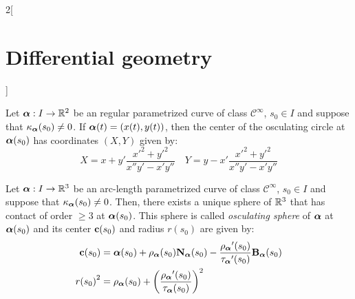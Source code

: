 \documentclass[../../../main.tex]{subfiles}
\begin{document}
\begin{multicols}{2}[\section{Differential geometry}]
  \begin{proposition}
    Let $\boldsymbol{\mathrm{\alpha}}:I\rightarrow\mathbb{R}^2$ be an regular parametrized curve of class $\mathcal{C}^\infty$, $s_0\in I$ and suppose that ${\kappa_{\boldsymbol{\mathrm{\alpha}}}}(s_0)\ne 0$. If $\boldsymbol{\mathrm{\alpha}}(t)=(x(t),y(t))$, then the center of the osculating circle at $\boldsymbol{\mathrm{\alpha}}(s_0)$ has coordinates $(X,Y)$ given by:
    $$X=x+y'\frac{{x'}^2+{y'}^2}{x''y'-x'y''}\quad Y=y-x'\frac{{x'}^2+{y'}^2}{x''y'-x'y''}$$
  \end{proposition}
  \begin{center}
    \begin{minipage}{\linewidth}
      \centering
      
    \end{minipage}
  \end{center}
  \begin{definition}
    Let $\boldsymbol{\mathrm{\alpha}}:I\rightarrow\mathbb{R}^3$ be an arc-length parametrized curve of class $\mathcal{C}^\infty$, $s_0\in I$ and suppose that ${\kappa_{\boldsymbol{\mathrm{\alpha}}}}(s_0)\ne 0$. Then, there exists a unique sphere of $\mathbb{R}^3$ that has contact of order $\geq 3$ at $\boldsymbol{\mathrm{\alpha}}(s_0)$. This sphere is called \emph{osculating sphere} of $\boldsymbol{\mathrm{\alpha}}$ at $\boldsymbol{\mathrm{\alpha}}(s_0)$ and its center $\boldsymbol{\mathrm{c}}(s_0)$ and radius $r(s_0)$ are given by:
    \begin{align*}
      \boldsymbol{\mathrm{c}}(s_0) & =\boldsymbol{\mathrm{\alpha}}(s_0)+{\rho_{\boldsymbol{\mathrm{\alpha}}}}(s_0){\boldsymbol{\mathrm{N}}_{\boldsymbol{\mathrm{\alpha}}}}(s_0)-\frac{{\rho_{\boldsymbol{\mathrm{\alpha}}}}'(s_0)}{{\tau_{\boldsymbol{\mathrm{\alpha}}}}'(s_0)}{\boldsymbol{\mathrm{B}}_{\boldsymbol{\mathrm{\alpha}}}}(s_0) \\
      {r(s_0)}^2  & ={\rho_{\boldsymbol{\mathrm{\alpha}}}}(s_0)+{\left(\frac{{\rho_{\boldsymbol{\mathrm{\alpha}}}}'(s_0)}{{\tau_{\boldsymbol{\mathrm{\alpha}}}}(s_0)}\right)}^2
    \end{align*}
  \end{definition}

\end{multicols}
\end{document}
